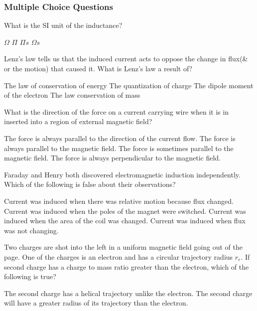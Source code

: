 \documentclass[12pt,addpoints]{exam}
\begin{document}
{{{				\subsubsection*{Multiple Choice Questions}
				\begin{questions}
					\question What is the SI unit of the inductance? \\ \begin{oneparchoices}
						\choice $\Omega$
						\choice $\Pi$
						\choice $\Pi s$
						\choice $\Omega s$
					\end{oneparchoices}
					\question Lenz's law tells us that the induced current acts to oppose the change in flux(\& or the motion) that caused it. What is Lenz's law a result of?
					\begin{choices}
						\choice The law of conservation of energy
						\choice The quantization of charge
						\choice The dipole moment of the electron
						\choice The law conservation of mass
					\end{choices}
					\question What is the direction of the force on a current carrying wire when it is in inserted into a region of external magnetic field?
					\begin{choices}
						\choice The force is always parallel to the direction of the current flow.
						\choice The force is always parallel to the magnetic field.
						\choice The force is sometimes parallel to the magnetic field.
						\choice The force is always perpendicular to the magnetic field.
					\end{choices}
					\question Faraday and Henry both discovered electromagnetic induction independently. Which of the following is false about their observations?
					\begin{choices}
						\choice Current was induced when there was relative motion because flux changed.
						\choice Current was induced when the poles of the magnet were switched.
						\choice Current was induced when the area of the coil was changed.
						\choice Current was induced when flux was not changing.
					\end{choices}
					\question Two charges are shot into the left in a uniform magnetic field going out of the page. One of the charges is an electron and has a circular trajectory radius $r_e$. If second charge has a charge to mass ratio greater than the electron, which of the following is true?
					\begin{choices}
						\choice The second charge has a helical trajectory unlike the electron.
						\choice The second charge will have a greater radius of its trajectory than the electron.

\end{choices}
\end{questions}}}}
\end{document}
